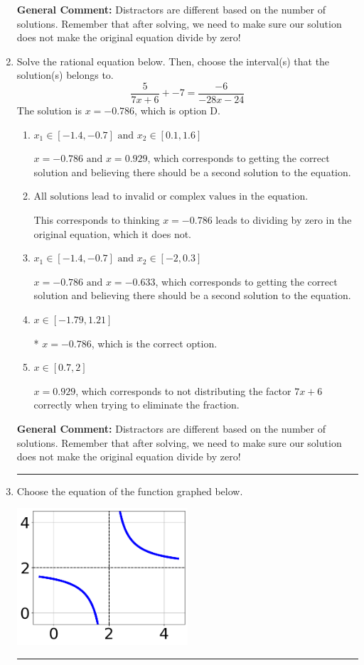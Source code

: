 \documentclass{extbook}[14pt]
\newcommand{\litem}[1]{\item #1

\rule{\textwidth}{0.4pt}}
\begin{document}
\begin{enumerate}
{\textbf{General Comment:} Distractors are different based on the number of solutions. Remember that after solving, we need to make sure our solution does not make the original equation divide by zero!
}
\litem{
Solve the rational equation below. Then, choose the interval(s) that the solution(s) belongs to.
\[ \frac{5}{7x + 6} + -7 = \frac{-6}{-28x -24} \]The solution is \( x = -0.786 \), which is option D.\begin{enumerate}[label=\Alph*.]
\item \( x_1 \in [-1.4, -0.7] \text{ and } x_2 \in [0.1,1.6] \)

$x = -0.786 \text{ and } x = 0.929$, which corresponds to getting the correct solution and believing there should be a second solution to the equation.
\item \( \text{All solutions lead to invalid or complex values in the equation.} \)

This corresponds to thinking $x = -0.786$ leads to dividing by zero in the original equation, which it does not.
\item \( x_1 \in [-1.4, -0.7] \text{ and } x_2 \in [-2,0.3] \)

$x = -0.786 \text{ and } x = -0.633$, which corresponds to getting the correct solution and believing there should be a second solution to the equation.
\item \( x \in [-1.79,1.21] \)

* $x = -0.786$, which is the correct option.
\item \( x \in [0.7,2] \)

$x = 0.929$, which corresponds to not distributing the factor $7x + 6$ correctly when trying to eliminate the fraction.
\end{enumerate}

\textbf{General Comment:} Distractors are different based on the number of solutions. Remember that after solving, we need to make sure our solution does not make the original equation divide by zero!
}
\litem{
Choose the equation of the function graphed below.

\begin{center}
    \includegraphics[width=0.5\textwidth]{../Figures/rationalGraphToEquationC.png}
\end{center}


}
\end{enumerate}
\end{document}

